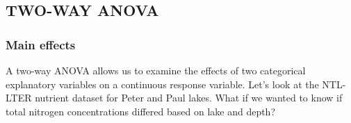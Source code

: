 \documentclass[]{article}
\newenvironment{Shaded}{\begin{snugshade}}{\end{snugshade}}
\newcommand{\KeywordTok}[1]{\textcolor[rgb]{0.13,0.29,0.53}{\textbf{#1}}}
\newcommand{\StringTok}[1]{\textcolor[rgb]{0.31,0.60,0.02}{#1}}
\newcommand{\CommentTok}[1]{\textcolor[rgb]{0.56,0.35,0.01}{\textit{#1}}}
\newcommand{\OperatorTok}[1]{\textcolor[rgb]{0.81,0.36,0.00}{\textbf{#1}}}
\newcommand{\NormalTok}[1]{#1}
\begin{document}
\subsection{TWO-WAY ANOVA}\label{two-way-anova}

\subsubsection{Main effects}\label{main-effects}

A two-way ANOVA allows us to examine the effects of two categorical
explanatory variables on a continuous response variable. Let's look at
the NTL-LTER nutrient dataset for Peter and Paul lakes. What if we
wanted to know if total nitrogen concentrations differed based on lake
and depth?

\begin{Shaded}
\end{Shaded}
\end{document}
